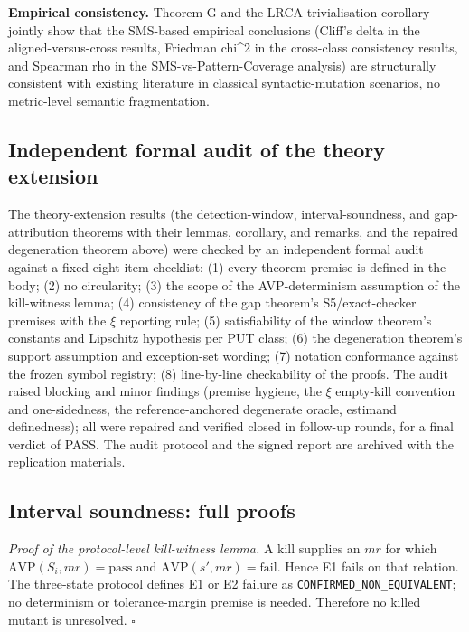 \documentclass[manuscript,screen,review]{acmart}
\begin{document}
\textbf{Empirical consistency.} Theorem G and the LRCA-trivialisation
corollary jointly
show that the SMS-based empirical conclusions (Cliff's delta in the aligned-versus-cross results,
Friedman chi\^{}2 in the cross-class consistency results, and Spearman rho in the SMS-vs-Pattern-Coverage analysis) are structurally consistent
with existing \citet{d7c38286734419b52de4262c9802ebdfcf4b9447} literature in classical
syntactic-mutation scenarios, no metric-level semantic fragmentation.

\subsection{Independent formal audit of the theory extension}\label{g.5-independent-formal-audit}

The theory-extension results (the detection-window, interval-soundness,
and gap-attribution theorems with their lemmas, corollary, and remarks,
and the repaired degeneration theorem above) were checked by an
independent formal audit against a fixed eight-item checklist: (1)
every theorem premise is defined in the body; (2) no circularity; (3)
the scope of the AVP-determinism assumption of the kill-witness lemma;
(4) consistency of the gap theorem's S5/exact-checker premises with the
$\xi$ reporting rule; (5) satisfiability of the window theorem's
constants and Lipschitz hypothesis per PUT class; (6) the degeneration
theorem's support assumption and exception-set wording; (7) notation
conformance against the frozen symbol registry; (8) line-by-line
checkability of the proofs. The audit raised blocking and minor
findings (premise hygiene, the $\xi$ empty-kill convention and
one-sidedness, the reference-anchored degenerate oracle, estimand
definedness); all were repaired and verified closed in follow-up
rounds, for a final verdict of PASS. The audit protocol and the signed
report are archived with the replication materials.

\subsection{Interval soundness: full proofs}\label{g.6-interval-proofs}

\emph{Proof of the protocol-level kill-witness lemma.} A kill supplies
an \(mr\) for which
\(\mathrm{AVP}(S_i,mr)=\mathrm{pass}\) and
\(\mathrm{AVP}(s',mr)=\mathrm{fail}\). Hence E1 fails on that relation.
The three-state protocol defines E1 or E2 failure as
\texttt{CONFIRMED\_NON\_EQUIVALENT}; no determinism or tolerance-margin
premise is needed. Therefore no killed mutant is unresolved. \(\square\)
\end{document}
